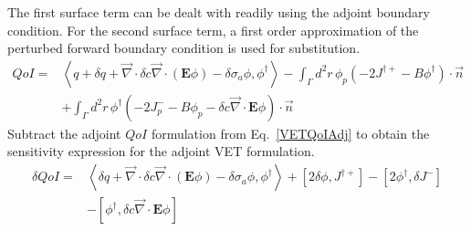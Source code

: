 \documentclass{article}
\newcommand{\bra}{\left\langle}
\newcommand{\ket}{\right\rangle}
\newcommand{\sbra}{\left[}
\newcommand{\sket}{\right]}
\newcommand{\vdiv}{\vec{\nabla} \cdot}
\newcommand{\Edd}{\mathbf{E}}
\newcommand{\siga}{\sigma_a}
\newcommand{\isigt}{c}
\newcommand{\scalSource}{q}
\newcommand{\qoi}{QoI}
\begin{document}
The first surface term can be dealt with readily using the adjoint boundary condition. For the second surface term, a first order approximation of the perturbed forward boundary condition is used for substitution.
\begin{equation}
\label{QoIVETAdj}
\begin{split}
\qoi =& \bra \scalSource + \delta \scalSource + \vdiv \delta \isigt \vdiv \left( \Edd \phi \right) - \delta \siga \phi, \phi^\dag \ket - \int_\Gamma d^2 r \, \phi_p \left( - 2J^{\dag +} - B \phi^\dag \right) \cdot \vec{n} 
\\ &+ \int_\Gamma d^2 r \, \phi^\dag \left( - 2J_p^- - B \phi_p - \delta \isigt \vdiv \Edd \phi \right) \cdot \vec{n} 
\end{split}
\end{equation}
Subtract the adjoint $\qoi$ formulation from Eq.~\eqref{VETQoIAdj} to obtain the sensitivity expression for the adjoint VET formulation.
\begin{equation}
\label{SensVETAdjNoBC}
\begin{split}
\delta \qoi =& \bra \delta \scalSource + \vdiv \delta \isigt \vdiv \left( \Edd \phi \right) - \delta \siga \phi, \phi^\dag \ket + \sbra 2\delta \phi, J^{\dag +} \sket  - \sbra 2\phi^\dag, \delta J^- \sket
\\ &- \sbra \phi^\dag, \delta \isigt \vdiv \Edd \phi \sket
\end{split}
\end{equation}


\end{document}
